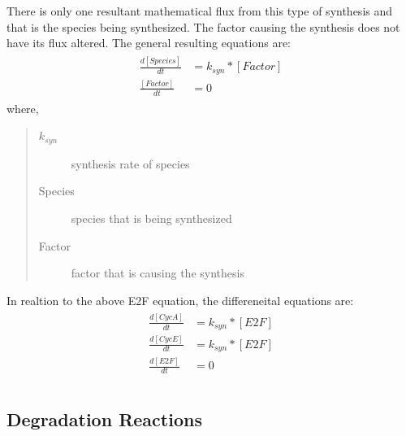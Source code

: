 \documentclass[letterpaper,10pt,english]{sphinxmanual}
\begin{document}
\sphinxAtStartPar
There is only one resultant mathematical flux from this type of synthesis and
that is the species being synthesized. The factor causing the synthesis does
not have its flux altered. The general resulting equations are:
\begin{equation*}
\begin{split}\begin{align*}
    \frac{d[Species]}{dt} &= k_{syn}*[Factor] \\
    \frac{[Factor]}{dt} &= 0
\end{align*}\end{split}
\end{equation*}
\sphinxAtStartPar
where,
\begin{quote}\begin{description}
\item[{\(k_{syn}\)}] \leavevmode
\sphinxAtStartPar
synthesis rate of species

\item[{Species}] \leavevmode
\sphinxAtStartPar
species that is being synthesized

\item[{Factor}] \leavevmode
\sphinxAtStartPar
factor that is causing the synthesis

\end{description}\end{quote}

\sphinxAtStartPar
In realtion to the above E2F equation, the differeneital equations are:
\begin{equation*}
\begin{split}\begin{align*}
    \frac{d[CycA]}{dt} &= k_{syn}*[E2F] \\
    \frac{d[CycE]}{dt} &= k_{syn}*[E2F] \\
    \frac{d[E2F]}{dt} &= 0 \\
\end{align*}\end{split}
\end{equation*}

\subsection{Degradation Reactions}
\label{\detokenize{pages/backend/eqn_info/4_degradation:degradation-reactions}}\label{\detokenize{pages/backend/eqn_info/4_degradation::doc}}
\end{document}
